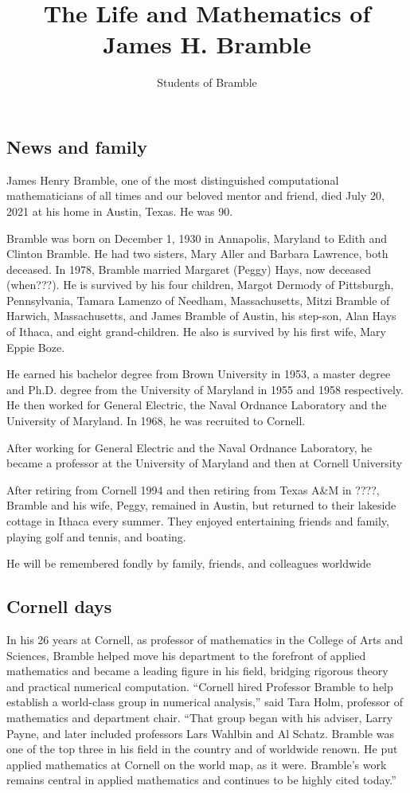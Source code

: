 \documentclass[CJK,11pt]{amsart}
\theoremstyle{definition}
\begin{document}
\begin{CJK*}{UTF8}{gbsn}
\title{
The Life and Mathematics of James H. Bramble
}
\author{Students of Bramble}
\maketitle

\section{News and family}
James Henry Bramble, one of the most distinguished computational mathematicians of all times and our beloved mentor and friend, died July 20, 2021 at his home in Austin, Texas. He was 90.

Bramble was born on December 1, 1930 in Annapolis, Maryland to Edith and Clinton Bramble. He had two sisters, Mary Aller and Barbara Lawrence, both deceased. 
In 1978, Bramble married Margaret (Peggy) Hays, now deceased (when???). 
He is survived by his four children, Margot Dermody of Pittsburgh, Pennsylvania, Tamara Lamenzo of Needham, Massachusetts, Mitzi Bramble of Harwich, Massachusetts, and James Bramble of Austin, his step-son, Alan Hays of Ithaca, and eight grand-children. He also is survived by his first wife, Mary Eppie Boze. 

He earned his bachelor degree from Brown University in 1953,  a master degree and Ph.D. degree from the University of Maryland in 1955 and 1958 respectively. He then worked for General Electric, the Naval Ordnance Laboratory and the University of Maryland. In 1968, he was recruited to Cornell.  

After working for General Electric and the Naval Ordnance Laboratory, he became a professor at the University of Maryland and then at Cornell University

After retiring from Cornell 1994 and then retiring from Texas A\&M in ????, Bramble and his wife, Peggy, remained in Austin, but returned to their lakeside cottage in Ithaca every summer. 
They enjoyed entertaining friends and family, playing golf and tennis, and boating.

He will be remembered fondly by family, friends, and colleagues worldwide

\subsection{Cornell days}
In his 26 years at Cornell, as professor of mathematics in the College of Arts and Sciences,  Bramble helped move his department to the forefront of applied mathematics and became a leading figure in his field, bridging rigorous theory and practical numerical computation.  “Cornell hired Professor Bramble to help establish a world-class group in numerical analysis,” said Tara Holm, professor of mathematics and department chair. “That group began with his adviser, Larry Payne, and later included professors Lars Wahlbin and Al Schatz. Bramble was one of the top three in his field in the country and of worldwide renown. He put applied mathematics at Cornell on the world map, as it were. Bramble’s work remains central in applied mathematics and continues to be highly cited today.”


\end{CJK*}
\end{document}
